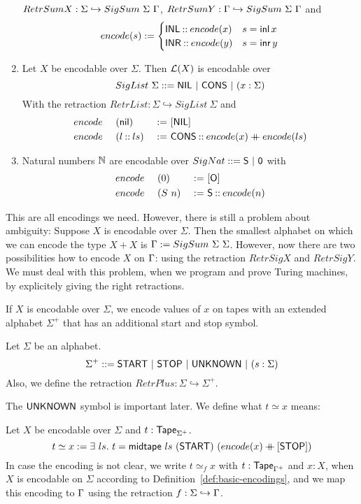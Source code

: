 \begin{definition}
\begin{enumerate}
    $RetrSumX : \Sigma \hookrightarrow SigSum~\Sigma~\Gamma$, $RetrSumY : \Gamma \hookrightarrow SigSum~\Sigma~\Gamma$ and
    \[
      encode(s) :=
      \begin{cases}
        \mathsf{INL} \mathbin{::} encode(x) & s=\operatorname{\mathsf{inl}} x \\
        \mathsf{INR} \mathbin{::} encode(y) & s=\operatorname{\mathsf{inr}} y
      \end{cases}
    \]
  \item Let $X$ be encodable over $\Sigma$.  Then $\mathcal{L}(X)$ is encodable over
    \[ SigList~\Sigma ::= \mathsf{NIL} ~|~ \mathsf{CONS} ~|~ (x:\Sigma) \]
    With the retraction $RetrList : \Sigma \hookrightarrow SigList~\Sigma$ and
    \begin{alignat*}{3}
      &encode~&&(\mathsf{nil}      ) &~:=~& [\mathsf{NIL}] \\
      &encode~&&(l \mathbin{::} ls) &~:=~& \mathsf{CONS} \mathbin{::} encode(x) \mathbin{+\mkern-10mu+} encode(ls)
    \end{alignat*}
  \item Natural numbers $\mathbb{N}$ are encodable over $ SigNat ::= \mathsf{S} ~|~ \mathsf{0} $ with
    \begin{alignat*}{3}
      &encode~&&(0  ) &~:=~& [\mathsf{O}] \\
      &encode~&&(S~n) &~:=~& \mathsf{S} \mathbin{::} encode(n)
    \end{alignat*}
  \end{enumerate}
\end{definition}

This are all encodings we need.  However, there is still a problem about ambiguity: Suppose $X$ is encodable over $\Sigma$.  Then the smallest
alphabet on which we can encode the type $X+X$ is $\Gamma := SigSum~\Sigma~\Sigma$.  However, now there are two possibilities how to encode $X$ on
$\Gamma$: using the retraction $RetrSigX$ and $RetrSigY$.  We must deal with this problem, when we program and prove Turing machines, by explicitely
giving the right retractions.

If $X$ is encodable over $\Sigma$, we encode values of $x$ on tapes with an extended alphabet $\Sigma^+$ that has an additional start and stop symbol.
\begin{definition}[$\Sigma^+$] Let $\Sigma$ be an alphabet.
  \[
    \Sigma^+ ::= \mathsf{START} ~|~ \mathsf{STOP} ~|~ \mathsf{UNKNOWN} ~|~ (s: \Sigma)
  \]
  Also, we define the retraction $RetrPlus : \Sigma \hookrightarrow \Sigma^+$.
\end{definition}
The $\mathsf{UNKNOWN}$ symbol is important later. We define what $t \simeq x$ means:
\begin{definition}[$t \simeq x$]
  \label{def:tape_contains}
  Let $X$ be encodable over $\Sigma$ and $t : \mathsf{Tape}_{\Sigma^+}$.
  \[
    t \simeq x := \exists~ls.~
    t = \mathsf{midtape}~ls~(\mathsf{START})~(encode(x) \mathbin{+\mkern-10mu+} [\mathsf{STOP}])
  \]
  In case the encoding is not clear, we write $t \simeq_{f} x$ with $t:\mathsf{Tape}_{\Gamma^+}$ and $x:X$, when $X$ is encodable on $\Sigma$ according to
  Definition~\ref{def:basic-encodings}, and we map this encoding to $\Gamma$ using the retraction $f: \Sigma \hookrightarrow \Gamma$.
\end{definition}

